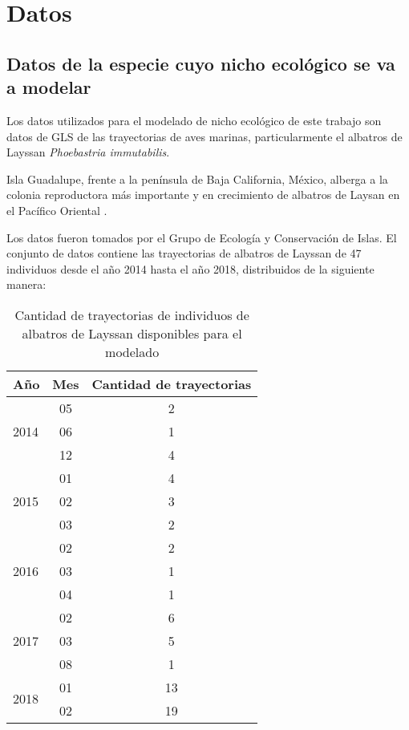 
\section*{Datos}

\subsection*{Datos de la especie cuyo nicho ecológico se va a modelar}

Los datos utilizados para el modelado de nicho ecológico de este trabajo son
datos de GLS de las trayectorias de aves marinas, particularmente el albatros de
Layssan \textit{Phoebastria immutabilis}.

Isla Guadalupe, frente a la península de Baja California, México, alberga a la
colonia reproductora más importante y en crecimiento de albatros de Laysan en el
Pacífico Oriental \cite{hernandez2014laysan}.

Los datos fueron tomados por el Grupo de Ecología y Conservación de Islas. El
conjunto de datos contiene las trayectorias de albatros de Layssan de 47
individuos desde el año 2014 hasta el año 2018, distribuidos de la siguiente
manera: \\

\begin{table}[h!]
\begin{center}
\begin{tabular}{lcc}
    Año & Mes & Cantidad de trayectorias \\
    \hline
    \multirow{3}{*}{2014} & 05 & 2\\
    & 06 & 1\\
    & 12 & 4\\
    \hline
    \multirow{3}{*}{2015} & 01 & 4\\
    & 02 & 3\\
    & 03 & 2\\
    \hline
    \multirow{3}{*}{2016} & 02 & 2\\
    & 03 & 1\\
    & 04 & 1\\
    \hline
    \multirow{3}{*}{2017} & 02 & 6 \\
    & 03 & 5 \\
    & 08 & 1 \\
    \hline
    \multirow{2}{*}{2018} & 01 & 13 \\
    & 02 & 19 \\
    \hline
\end{tabular}
\caption{ Cantidad de trayectorias de individuos de albatros de Layssan
disponibles para el modelado}
\end{center}
\end{table}



